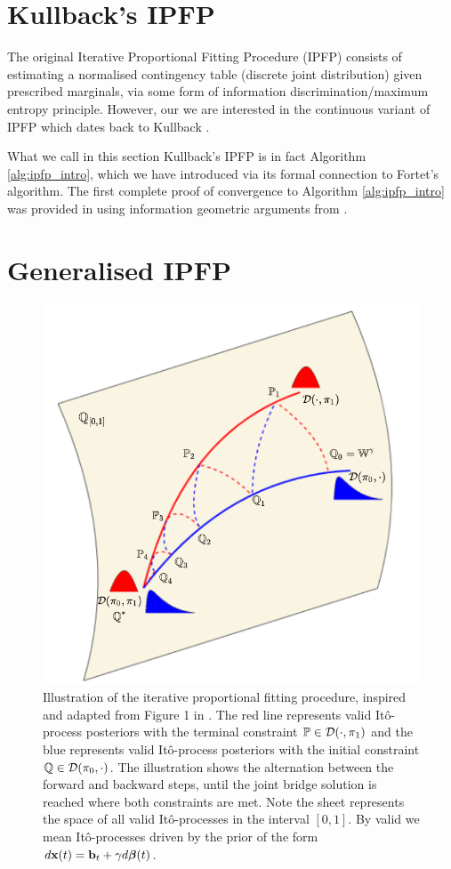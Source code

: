 \documentclass[a4paper,12pt,twoside,openright]{report}
\theoremstyle{definition}
\begin{document}
\section{Kullback's IPFP}
The original Iterative Proportional Fitting Procedure (IPFP) consists of estimating a normalised contingency table (discrete joint distribution) given prescribed marginals, via some form of information discrimination/maximum entropy principle. However, our we are interested in the continuous variant of IPFP which dates back to Kullback \citep{kullback1968probability}.

What we call in this section Kullback's IPFP is in fact Algorithm \ref{alg:ipfp_intro}, which we have introduced via its formal connection to Fortet's algorithm.  The first complete proof of convergence to Algorithm \ref{alg:ipfp_intro} was provided in \cite{ruschendorf1995convergence} using information geometric arguments from \cite{csiszar1975divergence}.

\section{Generalised IPFP}

\begin{figure}[t!]
    \centering
    \includegraphics[]{images/g-IPFP_ready.PNG}
    \caption{Illustration of the iterative proportional fitting procedure, inspired and adapted from Figure 1 in \cite{bernton2019schr}. The red line represents valid Itô-process posteriors with the terminal constraint ${\mathbb{P}} \in {\mathcal{D}}(\cdot, \pi_1)$ and the blue represents valid Itô-process posteriors with the initial constraint ${\mathbb{Q}} \in {\mathcal{D}}( \pi_0, \cdot)$. The illustration shows the alternation between the forward and backward steps, until the joint bridge solution is reached where both constraints are met. Note the sheet represents the space of all valid Itô-processes in the interval $[0,1]$. By valid we mean Itô-processes driven by the prior of the form $d{\mathbf{x}}(t) = {\mathbf{b}}_t + \gamma d{\bm{\beta}}(t)$.}
    \label{fig:info_pro}
\end{figure}
\end{document}
